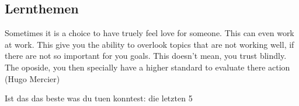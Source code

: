 \subsection{Lernthemen}
\begin{description}
	\item[Work-Concept / General] Sometimes it is a choice to have truely feel love  for someone. This can even work at work. This give you the ability to overlook topics that are not working well, if there are not so important for you goals. This doesn't mean, you trust blindly. The oposide, you then specially have a higher standard to evaluate there action (Hugo Mercier) 
	\item Ist das das beste was du tuen konntest: die letzten 5 %
\end{description}